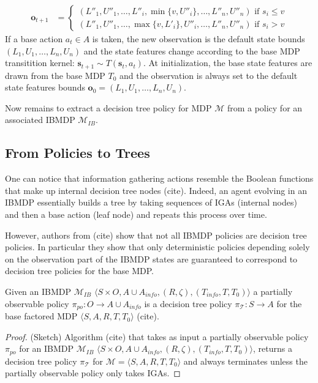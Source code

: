 \begin{definition}
\begin{itemize}
\begin{align*}
    \boldsymbol{o}_{t+1} &= \begin{cases}
        (L''_1, U''_1, \dots , L''_i, \min\{v, U''_i\}, \dots , L''_n, U''_n) \text{ if } s_i \leq v\\
        (L''_1, U''_1, \dots , \max\{v, L'_i\}, U''_i, \dots , L''_n, U''_n) \text{ if } s_i > v
    \end{cases}
\end{align*}
If a base action $a_t\in A$ is taken, the new observation is the default state bounds $(L_1, U_1,\dots, L_n, U_n)$ and the state features change according to the base MDP transitition kernel: $\boldsymbol{s}_{t+1}\sim T(\boldsymbol{s}_t, a_t)$.
At initialization, the base state features are drawn from the base MDP $T_0$ and the observation is always set to the default state features bounds $\boldsymbol{o}_0=(L_1, U_1,\dots, L_n, U_n)$.
\end{itemize}
\end{definition}
Now remains to extract a decision tree policy for MDP $\mathcal{M}$ from a policy for an associated IBMDP $\mathcal{M}_{IB}$. 

\subsection{From Policies to Trees}

One can notice that information gathering actions resemble the Boolean functions that make up internal decision tree nodes (cite). 
Indeed, an agent evolving in an IBMDP essentially builds a tree by taking sequences of IGAs (internal nodes) and then a base action (leaf node) and repeats this process over time.

However, authors from (cite) show that not all IBMDP policies are decision tree policies. In particular they show that only deterministic policies depending solely on the observation part of the IBMDP states are guaranteed to correspond to decision tree policies for the base MDP.

\begin{proposition} 
    Given an IBMDP $\mathcal{M}_{IB} $ $ \langle S \times O,A \cup A_{info}, (R, \zeta), (T_{info}, T, T_0)\rangle$ a partially observable policy $\pi_{po}: O \rightarrow A\cup A_{info}$ is a decision tree policy $\pi_{\mathcal{T}}: S \rightarrow A$ for the base factored MDP $\langle S, A, R, T, T_0\rangle$ (cite).
\end{proposition}
\begin{proof}(Sketch) Algorithm (cite) that takes as input a partially observable policy $\pi_{po}$ for an IBMDP $\mathcal{M}_{IB}$ $\langle S \times O,A \cup A_{info}, (R, \zeta), (T_{info}, T, T_0)\rangle$, returns a decision tree policy $\pi_{\mathcal{T}}$ for $\mathcal{M}=\langle S, A, R, T, T_0\rangle$ and always terminates unless the partially observable policy only takes IGAs.
\end{proof}

